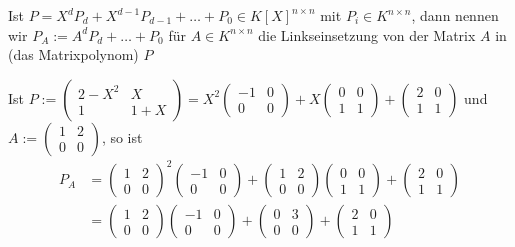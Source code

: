 \documentclass[../../main.tex]{subfiles}
\begin{document}
\begin{df}\label{17.4.5}
    Ist $P=X^dP_d+X^{d-1}P_{d-1}+\ldots +P_0\in K[X]^{n\times n}$ mit $P_i\in K^{n\times n}$, dann nennen wir $P_A:=A^dP_d+\ldots +P_0$ für $A\in K^{n\times n}$ die Linkseinsetzung von der Matrix $A$ in (das Matrixpolynom) $P$
\end{df}

\begin{bsp}\label{17.4.6} 
    Ist $P:=\begin{pmatrix}2-X^2&X\\ 1&1+X\end{pmatrix}=X^2\begin{pmatrix}-1&0\\0&0\end{pmatrix}+X\begin{pmatrix}0&0\\1&1\end{pmatrix}+\begin{pmatrix}2&0\\1&1\end{pmatrix}$ und $A:=\begin{pmatrix}1&2\\0&0\end{pmatrix}$, so ist
    \begin{align*}
        P_A&=\begin{pmatrix}1&2\\0&0\end{pmatrix}^2\begin{pmatrix}-1&0\\0&0\end{pmatrix}+\begin{pmatrix}1&2\\0&0\end{pmatrix}\begin{pmatrix}0&0\\1&1\end{pmatrix}+\begin{pmatrix}2&0\\1&1\end{pmatrix}\\
        &=\begin{pmatrix}1&2\\0&0\end{pmatrix}\begin{pmatrix}-1&0\\0&0\end{pmatrix}+\begin{pmatrix}0&3\\0&0\end{pmatrix}+\begin{pmatrix}2&0\\1&1\end{pmatrix}

\end{align*}
\end{bsp}
\end{document}
